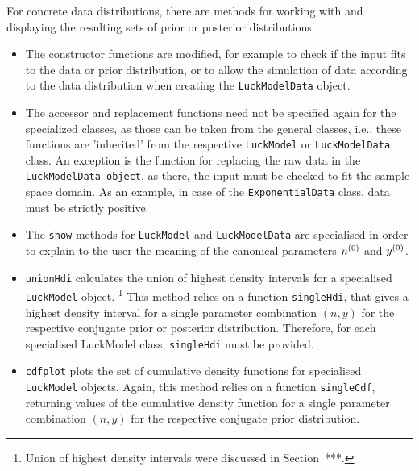 For concrete data distributions, there are methods for working with
and displaying the resulting sets of prior or posterior distributions.
\begin{itemize}
\item The constructor functions are modified, for example to check if the input
   fits to the data or prior distribution, or to allow the simulation of data
   according to the data distribution when creating the \texttt{LuckModelData} object.
\item The accessor and replacement functions need not be specified again for the
   specialized classes, as those can be taken from the general classes, i.e.,
   these functions are 'inherited' from the respective \texttt{LuckModel} or \texttt{LuckModelData}
   class. An exception is the function for replacing the raw data in the
   \texttt{LuckModelData object}, as there, the input must be checked to fit the sample
   space domain. As an example, in case of the \texttt{ExponentialData} class, data must be
   strictly positive.
\item The \texttt{show} methods for \texttt{LuckModel} and \texttt{LuckModelData} are specialised in order
   to explain to the user the meaning of the canonical parameters $n^{(0)}$ and $y^{(0)}$.
\item \texttt{unionHdi} calculates the union of highest density intervals for a
   specialised \texttt{LuckModel} object.%
   \footnote{Union of highest density intervals were discussed in Section~***.}
   This method relies on a function \texttt{singleHdi},
   that gives a highest density interval for a single parameter combination
   $(n, y)$ for the respective conjugate prior or posterior distribution.
   Therefore, for each specialised LuckModel class, \texttt{singleHdi} must be
   provided.
\item \texttt{cdfplot} plots the set of cumulative density functions for specialised
   \texttt{LuckModel} objects. Again, this method relies on a function \texttt{singleCdf},
   returning values of the cumulative density function for a single parameter combination $(n, y)$
   for the respective conjugate prior distribution.
\end{itemize}












